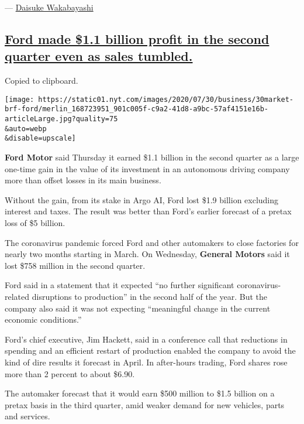 --- \href{https://www.nytimes.com/by/daisuke-wakabayashi}{Daisuke
Wakabayashi}

\hypertarget{ford-made-11-billion-profit-in-the-second-quarter-even-as-sales-tumbled}{%
\subsection{\texorpdfstring{\protect\hyperlink{ford-made-1-1-billion-profit-in-the-second-quarter-even-as-sales-tumbled}{Ford
made \$1.1 billion profit in the second quarter even as sales
tumbled.}}{Ford made \$1.1 billion profit in the second quarter even as sales tumbled.}}\label{ford-made-11-billion-profit-in-the-second-quarter-even-as-sales-tumbled}}

Copied to clipboard.

\texttt{[image: https://static01.nyt.com/images/2020/07/30/business/30market-brf-ford/merlin\_168723951\_901c005f-c9a2-41d8-a9bc-57af4151e16b-articleLarge.jpg?quality=75\\\&auto=webp\\\&disable=upscale]}

\textbf{Ford Motor} said Thursday it earned \$1.1 billion in the second
quarter as a large one-time gain in the value of its investment in an
autonomous driving company more than offset losses in its main business.

Without the gain, from its stake in Argo AI, Ford lost \$1.9 billion
excluding interest and taxes. The result was better than Ford's earlier
forecast of a pretax loss of \$5 billion.

The coronavirus pandemic forced Ford and other automakers to close
factories for nearly two months starting in March. On Wednesday,
\textbf{General Motors} said it lost \$758 million in the second
quarter.

Ford said in a statement that it expected ``no further significant
coronavirus-related disruptions to production'' in the second half of
the year. But the company also said it was not expecting ``meaningful
change in the current economic conditions.''

Ford's chief executive, Jim Hackett, said in a conference call that
reductions in spending and an efficient restart of production enabled
the company to avoid the kind of dire results it forecast in April. In
after-hours trading, Ford shares rose more than 2 percent to about
\$6.90.

The automaker forecast that it would earn \$500 million to \$1.5 billion
on a pretax basis in the third quarter, amid weaker demand for new
vehicles, parts and services.

